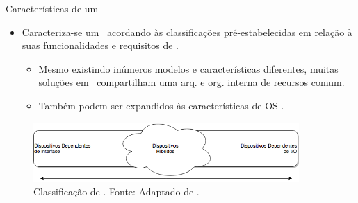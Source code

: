    
      \begin{frame}{Características de um \Wearable}
         \begin{itemize}
            \item Caracteriza-se um \wearable\ acordando às classificações pré-estabelecidas em relação à suas funcionalidades e requisitos de \hardware. 
            \begin{itemize}
               \setlength{\itemsep}{1.5em}
               \item Mesmo existindo inúmeros modelos e características diferentes, muitas soluções em \hardware\ compartilham uma arq. e org. interna de recursos comum.
               
               \item Também podem ser expandidos às características de OS \cite{Delabrida2016, Amorim2017}.
               
            \end{itemize}
         \end{itemize}
 
         \begin{figure}[h] \centering
            \vspace{-5pt}
            \includegraphics[width=0.9\textwidth]{img/rt-gradiente.png}
            \caption{Classificação de \wearables. Fonte: Adaptado de \cite{Amorim2017}.}
         \end{figure}
      \end{frame}
   
